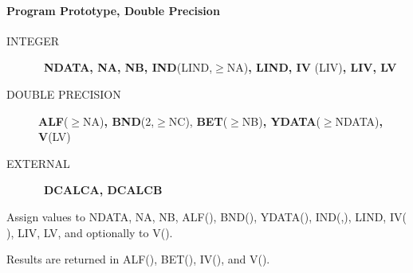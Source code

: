 \documentclass[twoside]{MATH77}
\begin{document}
\paragraph{Program Prototype, Double Precision}
\begin{description}
\item[INTEGER]  \ {\bf NDATA, NA, NB, IND}(LIND,$\geq $NA){\bf , LIND, IV}%
(LIV){\bf , LIV, LV}

\item[DOUBLE PRECISION]  {\bf ALF}($\geq $NA){\bf , BND}(2,$\geq $NC), {\bf %
BET}($\geq $NB){\bf , YDATA}($\geq $NDATA){\bf , V}(LV)

\item[EXTERNAL]  \ {\bf DCALCA, DCALCB}
\end{description}
Assign values to NDATA, NA, NB, ALF(), BND(), YDATA(), IND(,), LIND, IV( ),
LIV, LV, and optionally to V().
\begin{center}
\end{center}
Results are returned in ALF(), BET(), IV(), and V().
\end{document}
